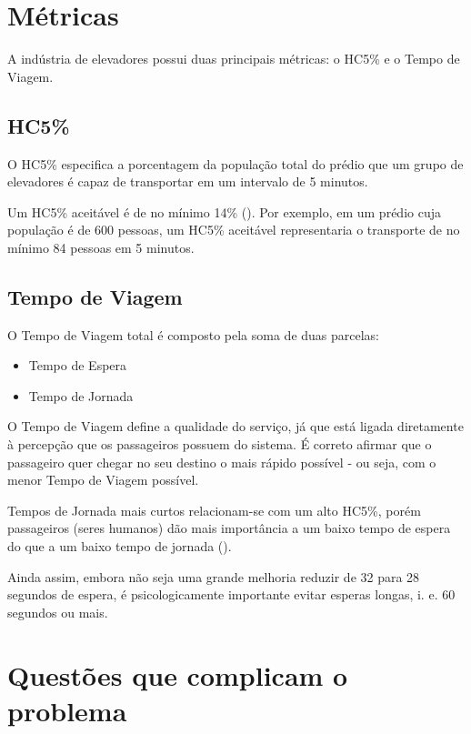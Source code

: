 \section{Métricas}

  A indústria de elevadores possui duas principais métricas: o HC5\% e o Tempo de Viagem.

\subsection{HC5\%}

 O HC5\% especifica a porcentagem da população total do prédio que um grupo de elevadores é capaz de transportar em um intervalo de 5 minutos.

 Um HC5\% aceitável é de no mínimo 14\% (\cite{KOEHLEROTTIGER02}). Por exemplo, em um prédio cuja população é de 600 pessoas, um HC5\% aceitável representaria o transporte de no mínimo 84 pessoas em 5 minutos.

\subsection{Tempo de Viagem}

  O Tempo de Viagem total é composto pela soma de duas parcelas:

  \begin{itemize}
    \item Tempo de Espera
    \item Tempo de Jornada
  \end{itemize}

  O Tempo de Viagem define a qualidade do serviço, já que está ligada diretamente à percepção que os passageiros possuem do sistema. É correto afirmar que o passageiro quer chegar no seu destino o mais rápido possível - ou seja, com o menor Tempo de Viagem possível.

  Tempos de Jornada mais curtos relacionam-se com um alto HC5\%, porém passageiros (seres humanos) dão mais importância a um baixo tempo de espera do que a um baixo tempo de jornada (\cite{KOEHLEROTTIGER02}).

  Ainda assim, embora não seja uma grande melhoria reduzir de 32 para 28 segundos de espera, é psicologicamente importante evitar esperas longas, i. e. 60 segundos ou mais.

\section{Questões que complicam o problema}

